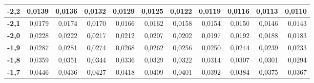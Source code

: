 \documentclass[aspectratio=149,10pt,xcolor=dvipsnames,t]{beamer}
\begin{document}
\begin{frame}
{\begin{tabular}{|r||r|r|r|r|r|r|r|r|r|r|}
\hline
\textbf{-2,2}& 
0,0139& 
0,0136& 
0,0132& 
0,0129& 
0,0125& 
0,0122& 
0,0119& 
0,0116& 
0,0113& 
0,0110 \\
\hline
\textbf{-2,1}& 
0,0179& 
0,0174& 
0,0170& 
0,0166& 
0,0162& 
0,0158& 
0,0154& 
0,0150& 
0,0146& 
0,0143 \\
\hline
\textbf{-2,0}& 
0,0228& 
0,0222& 
0,0217& 
0,0212& 
0,0207& 
0,0202& 
0,0197& 
0,0192& 
0,0188& 
0,0183 \\
\hline
\textbf{-1,9}& 
0,0287& 
0,0281& 
0,0274& 
0,0268& 
0,0262& 
0,0256& 
0,0250& 
0,0244& 
0,0239& 
0,0233 \\
\hline
\textbf{-1,8}& 
0,0359& 
0,0351& 
0,0344& 
0,0336& 
0,0329& 
0,0322& 
0,0314& 
0,0307& 
0,0301& 
0,0294 \\
\hline
\textbf{-1,7}& 
0,0446& 
0,0436& 
0,0427& 
0,0418& 
0,0409& 
0,0401& 
0,0392& 
0,0384& 
0,0375& 
0,0367 \\
\hline
\end{tabular}
}
\end{frame}
\end{document}
